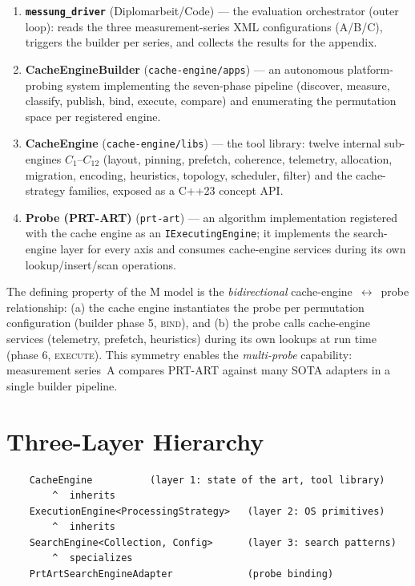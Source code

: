 \begin{enumerate}
  \item \textbf{\texttt{messung\_driver}} (Diplomarbeit/Code) --- the evaluation
        orchestrator (outer loop): reads the three measurement-series XML configurations
        (A/B/C), triggers the builder per series, and collects the results for the appendix.
  \item \textbf{CacheEngineBuilder} (\texttt{cache-engine/apps}) --- an autonomous
        platform-probing system implementing the seven-phase pipeline (discover, measure,
        classify, publish, bind, execute, compare) and enumerating the permutation space
        per registered engine.
  \item \textbf{CacheEngine} (\texttt{cache-engine/libs}) --- the tool library: twelve
        internal sub-engines $C_1$--$C_{12}$ (layout, pinning, prefetch, coherence,
        telemetry, allocation, migration, encoding, heuristics, topology, scheduler,
        filter) and the cache-strategy families, exposed as a C++23 concept API.
  \item \textbf{Probe (PRT-ART)} (\texttt{prt-art}) --- an algorithm implementation
        registered with the cache engine as an \texttt{IExecutingEngine}; it implements the
        search-engine layer for every axis and consumes cache-engine services during its
        own lookup/insert/scan operations.
\end{enumerate}

The defining property of the M model is the \emph{bidirectional} cache-engine~$\leftrightarrow$~probe
relationship: (a) the cache engine instantiates the probe per permutation configuration
(builder phase 5, \textsc{bind}), and (b) the probe calls cache-engine services
(telemetry, prefetch, heuristics) during its own lookups at run time (phase 6,
\textsc{execute}). This symmetry enables the \emph{multi-probe} capability: measurement
series~A compares PRT-ART against many SOTA adapters in a single builder pipeline.

\section{Three-Layer Hierarchy}\label{sec:three-layer}

\begin{verbatim}
    CacheEngine          (layer 1: state of the art, tool library)
        ^  inherits
    ExecutionEngine<ProcessingStrategy>   (layer 2: OS primitives)
        ^  inherits
    SearchEngine<Collection, Config>      (layer 3: search patterns)
        ^  specializes
    PrtArtSearchEngineAdapter             (probe binding)
\end{verbatim}

